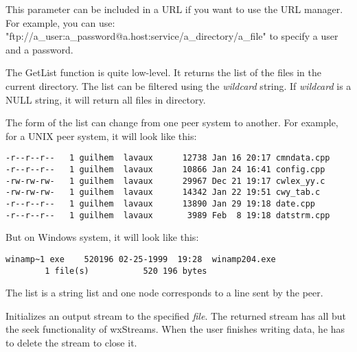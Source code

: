 
This parameter can be included in a URL if you want to use the URL manager.
For example, you can use: "ftp://a\_user:a\_password@a.host:service/a\_directory/a\_file"
to specify a user and a password.



The GetList function is quite low-level. It returns the list of the files in
the current directory. The list can be filtered using the {\it wildcard} string.
If {\it wildcard} is a NULL string, it will return all files in directory.

The form of the list can change from one peer system to another. For example,
for a UNIX peer system, it will look like this:

\begin{verbatim}
-r--r--r--   1 guilhem  lavaux      12738 Jan 16 20:17 cmndata.cpp
-r--r--r--   1 guilhem  lavaux      10866 Jan 24 16:41 config.cpp
-rw-rw-rw-   1 guilhem  lavaux      29967 Dec 21 19:17 cwlex_yy.c
-rw-rw-rw-   1 guilhem  lavaux      14342 Jan 22 19:51 cwy_tab.c
-r--r--r--   1 guilhem  lavaux      13890 Jan 29 19:18 date.cpp
-r--r--r--   1 guilhem  lavaux       3989 Feb  8 19:18 datstrm.cpp
\end{verbatim}

But on Windows system, it will look like this:

\begin{verbatim}
winamp~1 exe    520196 02-25-1999  19:28  winamp204.exe
        1 file(s)           520 196 bytes
\end{verbatim}

The list is a string list and one node corresponds to a line sent by the peer.




Initializes an output stream to the specified {\it file}. The returned
stream has all but the seek functionality of wxStreams. When the user finishes
writing data, he has to delete the stream to close it.


